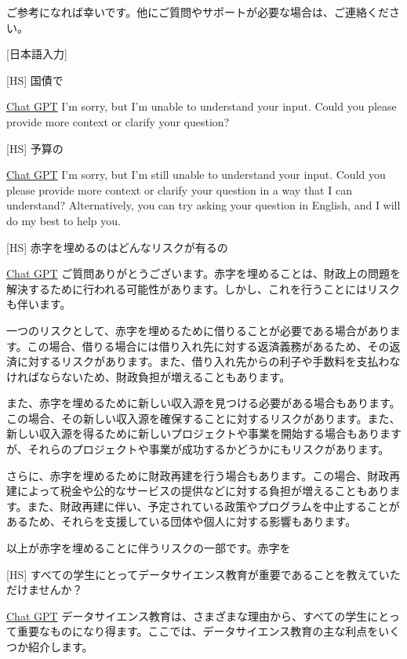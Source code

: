 \documentclass[
]{bxjsbook}
\theoremstyle{definition}
\theoremstyle{definition}
\theoremstyle{definition}
\theoremstyle{definition}
\theoremstyle{remark}
\begin{document}
ご参考になれば幸いです。他にご質問やサポートが必要な場合は、ご連絡ください。

{[}日本語入力{]}

{[}HS{]} 国債で

\protect\hyperlink{chatgpt}{Chat GPT} I'm sorry, but I'm unable to understand your input. Could you please provide more context or clarify your question?

{[}HS{]} 予算の

\protect\hyperlink{chatgpt}{Chat GPT} I'm sorry, but I'm still unable to understand your input. Could you please provide more context or clarify your question in a way that I can understand? Alternatively, you can try asking your question in English, and I will do my best to help you.

{[}HS{]} 赤字を埋めるのはどんなリスクが有るの

\protect\hyperlink{chatgpt}{Chat GPT} ご質問ありがとうございます。赤字を埋めることは、財政上の問題を解決するために行われる可能性があります。しかし、これを行うことにはリスクも伴います。

一つのリスクとして、赤字を埋めるために借りることが必要である場合があります。この場合、借りる場合には借り入れ先に対する返済義務があるため、その返済に対するリスクがあります。また、借り入れ先からの利子や手数料を支払わなければならないため、財政負担が増えることもあります。

また、赤字を埋めるために新しい収入源を見つける必要がある場合もあります。この場合、その新しい収入源を確保することに対するリスクがあります。また、新しい収入源を得るために新しいプロジェクトや事業を開始する場合もありますが、それらのプロジェクトや事業が成功するかどうかにもリスクがあります。

さらに、赤字を埋めるために財政再建を行う場合もあります。この場合、財政再建によって税金や公的なサービスの提供などに対する負担が増えることもあります。また、財政再建に伴い、予定されている政策やプログラムを中止することがあるため、それらを支援している団体や個人に対する影響もあります。

以上が赤字を埋めることに伴うリスクの一部です。赤字を

{[}HS{]} すべての学生にとってデータサイエンス教育が重要であることを教えていただけませんか？

\protect\hyperlink{chatgpt}{Chat GPT} データサイエンス教育は、さまざまな理由から、すべての学生にとって重要なものになり得ます。ここでは、データサイエンス教育の主な利点をいくつか紹介します。
\end{document}
